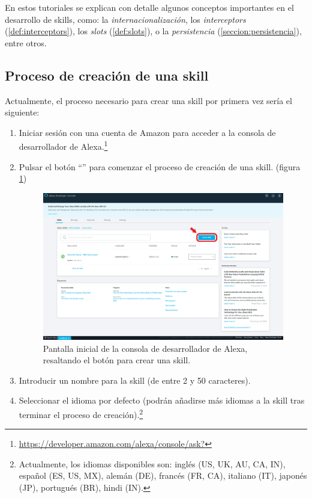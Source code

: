 \documentclass[11pt,spanish,listoffigures,listoftables,table,hyphens,dvipsnames]{tfgetsinf}
\newcommand{\fe}[1]{\foreign{english}{#1}}
\begin{document}
En estos tutoriales se explican con detalle algunos conceptos importantes en el desarrollo de skills, como: la \emph{internacionalización}, los \emph{interceptors} (\ref{def:interceptors}), los \emph{slots} (\ref{def:slots}), o la \emph{persistencia} (\ref{seccion:persistencia}), entre otros.

\subsection{Proceso de creación de una skill}

Actualmente, el proceso necesario para crear una skill por primera vez sería el siguiente:

\begin{enumerate}
   \item Iniciar sesión con una cuenta de Amazon para acceder a la consola de desarrollador de Alexa.\footnote{\url{https://developer.amazon.com/alexa/console/ask?}}
   \item Pulsar el botón ``\fe{Create Skill}'' para comenzar el proceso de creación de una skill. (figura \ref{figura:alexa-console})
   
   \begin{figure}[ht]
      \centering
      \includegraphics[width=\textwidth]{alexa-console-create-skill-button.png}
      \caption{Pantalla inicial de la consola de desarrollador de Alexa, resaltando el botón para crear una skill.}
      \label{figura:alexa-console}
   \end{figure}

   \item Introducir un nombre para la skill (de entre 2 y 50 caracteres).

   \item Seleccionar el idioma por defecto (podrán añadirse más idiomas a la skill tras terminar el proceso de creación).\footnote{Actualmente, los idiomas disponibles son: inglés (US, UK, AU, CA, IN), español (ES, US, MX), alemán (DE), francés (FR, CA), italiano (IT), japonés (JP), portugués (BR), hindi (IN).}


\end{enumerate}
\end{document}
